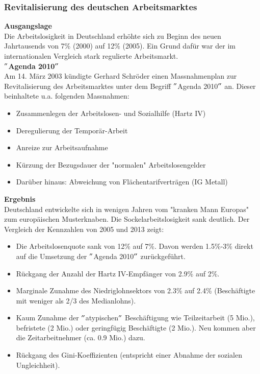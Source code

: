 \subsubsection{Revitalisierung des deutschen Arbeitsmarktes}

\textbf{Ausgangslage}\\
Die Arbeitslosigkeit in Deutschland erhöhte sich zu Beginn des neuen Jahrtausends von 7\% (2000) auf 12\% (2005). Ein Grund dafür war der im internationalen Vergleich stark regulierte Arbeitsmarkt.\\
\vspace{\baselineskip}
\textbf{$"$Agenda 2010$"$}\\
Am 14. März 2003 kündigte Gerhard Schröder einen Massnahmenplan zur Revitalisierung des Arbeitsmarktes unter dem Begriff $"$Agenda 2010$"$ an. Dieser beinhaltete u.a. folgenden Massnahmen:
\begin{itemize}
	\item Zusammenlegen der Arbeitslosen- und Sozialhilfe (Hartz IV)
	\item Deregulierung der Temporär-Arbeit
	\item Anreize zur Arbeitsaufnahme
	\item Kürzung der Bezugsdauer der "normalen" Arbeitslosengelder
	\item Darüber hinaus: Abweichung von Flächentarifverträgen (IG Metall)
\end{itemize}
\vspace{\baselineskip}
\textbf{Ergebnis}\\
Deutschland entwickelte sich in wenigen Jahren vom "kranken Mann Europas" zum europäischen Musterknaben. Die Sockelarbeitslosigkeit sank deutlich. Der Vergleich der Kennzahlen von 2005 und 2013 zeigt:
\begin{itemize}
	\item Die Arbeitslosenquote sank von 12\% auf 7\%. Davon werden 1.5\%-3\% direkt auf die Umsetzung der $"$Agenda 2010$"$ zurückgeführt.
	\item Rückgang der Anzahl der Hartz IV-Empfänger von 2.9\% auf 2\%.
	\item Marginale Zunahme des Niedriglohnsektors von 2.3\% auf 2.4\% (Beschäftigte mit weniger als 2/3 des Medianlohns).
	\item Kaum Zunahme der $"$atypischen$"$ Beschäftigung wie Teilzeitarbeit (5 Mio.), befristete (2 Mio.) oder geringfügig Beschäftigte (2 Mio.). Neu kommen aber die Zeitarbeitnehmer (ca. 0.9 Mio.) dazu.
	\item Rückgang des Gini-Koeffizienten (entspricht einer Abnahme der sozialen Ungleichheit).
\end{itemize}
